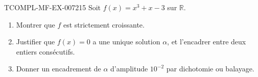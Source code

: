 \begin{exercice}{TCOMPL-MF-EX-007}{2}{15}
Soit $f(x)=x^3+x-3$ sur $\mathbb{R}$.
\begin{enumerate}
  \item Montrer que $f$ est strictement croissante.
  \item Justifier que $f(x)=0$ a une unique solution $\alpha$, et l'encadrer
        entre deux entiers consécutifs.
  \item Donner un encadrement de $\alpha$ d'amplitude $10^{-2}$ par
        dichotomie ou balayage.
\end{enumerate}
\end{exercice}
